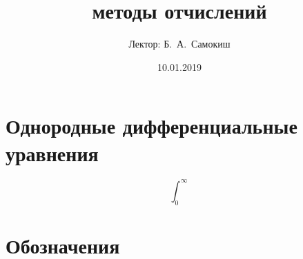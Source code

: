\documentclass{trlnotes}
\title{методы отчислений}
\date{10.01.2019}
\author{Лектор: Б.~А.~Самокиш}
\begin{document}
 
\maketitle
\tableofcontents
\clearpage

\chapter{Однородные дифференциальные уравнения}
\label{chap:ode}


\[
  \int_0^{\infty}
\]

\clearpage

\appendix
\chapter{Обозначения}
% 

\end{document}
